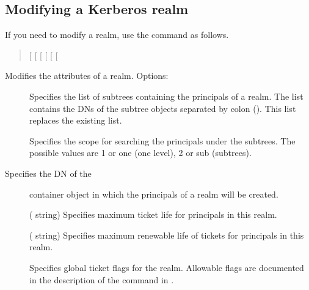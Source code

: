 \documentclass[letterpaper,10pt,english]{sphinxmanual}
\begin{document}
\subsection{Modifying a Kerberos realm}
\label{\detokenize{admin/database:ldap-mod-realm}}\label{\detokenize{admin/database:modifying-a-kerberos-realm}}
If you need to modify a realm, use the {\hyperref[\detokenize{admin/admin_commands/kdb5_ldap_util:kdb5-ldap-util-8}]{}}
 command as follows.
\begin{quote}

{[} \sphinxstyleemphasis{subtree\_dn\_list}{]}
{[} \sphinxstyleemphasis{search\_scope}{]}
{[} \sphinxstyleemphasis{container\_reference\_dn}{]}
{[} \sphinxstyleemphasis{max\_ticket\_life}{]}
{[} \sphinxstyleemphasis{max\_renewable\_ticket\_life}{]}
{[}\sphinxstyleemphasis{ticket\_flags}{]}
\end{quote}

Modifies the attributes of a realm.  Options:
\begin{description}
\item[{ }] \leavevmode
Specifies the list of subtrees containing the principals of a
realm.  The list contains the DNs of the subtree objects separated
by colon (\sphinxcode{:}).  This list replaces the existing list.

\item[{ }] \leavevmode
Specifies the scope for searching the principals under the
subtrees.  The possible values are 1 or one (one level), 2 or sub
(subtrees).

\item[{  Specifies the DN of the}] \leavevmode
container object in which the principals of a realm will be
created.

\item[{ }] \leavevmode
( string) Specifies maximum ticket life for
principals in this realm.

\item[{ }] \leavevmode
( string) Specifies maximum renewable life of
tickets for principals in this realm.

\item[{}] \leavevmode
Specifies global ticket flags for the realm.  Allowable flags are
documented in the description of the  command in
{\hyperref[\detokenize{admin/admin_commands/kadmin_local:kadmin-1}]{}}.

\end{description}
\end{document}
